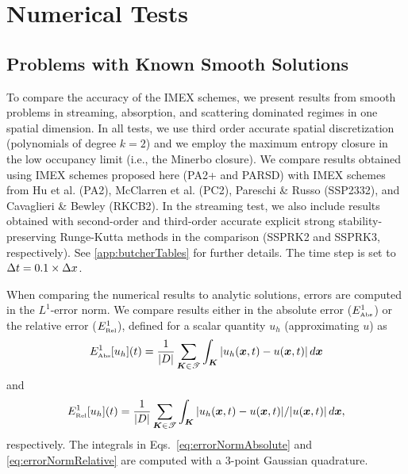\section{Numerical Tests}
\label{sec:numerical}

\subsection{Problems with Known Smooth Solutions}
\label{sec:smoothProblems}

To compare the accuracy of the IMEX schemes, we present results from smooth problems in streaming, absorption, and scattering dominated regimes in one spatial dimension.  
In all tests, we use third order accurate spatial discretization (polynomials of degree $k=2$) and we employ the maximum entropy closure in the low occupancy limit (i.e., the Minerbo closure).  
We compare results obtained using IMEX schemes proposed here (PA2+ and PARSD) with IMEX schemes from Hu et al. \cite{hu_etal_2017} (PA2), McClarren et al. \cite{mcclarren_etal_2008} (PC2), Pareschi \& Russo \cite{pareschiRusso_2005} (SSP2332), and Cavaglieri \& Bewley \cite{cavaglieriBewley2015} (RKCB2).  
In the streaming test, we also include results obtained with second-order and third-order accurate explicit strong stability-preserving Runge-Kutta methods \cite{gottlieb_etal_2001} in the comparison (SSPRK2 and SSPRK3, respectively).  
See \ref{app:butcherTables} for further details.  
The time step is set to $\Delta t=0.1\times\Delta x$.  

When comparing the numerical results to analytic solutions, errors are computed in the $L^{1}$-error norm.  
We compare results either in the absolute error ($E_{\mbox{\tiny Abs}}^{1}$) or the relative error ($E_{\mbox{\tiny Rel}}^{1}$), defined for a scalar quantity $u_{h}$ (approximating $u$) as
\begin{equation}
  E_{\mbox{\tiny Abs}}^{1}[u_{h}](t)
  =\frac{1}{|D|}\sum_{\boldsymbol{K}\in\mathscr{T}}\int_{\boldsymbol{K}}|u_{h}(\boldsymbol{x},t)-u(\boldsymbol{x},t)|\,d\boldsymbol{x}
  \label{eq:errorNormAbsolute}
\end{equation}
and
\begin{equation}
  E_{\mbox{\tiny Rel}}^{1}[u_{h}](t)
  =\frac{1}{|D|}\sum_{\boldsymbol{K}\in\mathscr{T}}\int_{\boldsymbol{K}}|u_{h}(\boldsymbol{x},t)-u(\boldsymbol{x},t)|/|u(\boldsymbol{x},t)|\,d\boldsymbol{x},
  \label{eq:errorNormRelative}
\end{equation}
respectively.  
The integrals in Eqs.~\eqref{eq:errorNormAbsolute} and \eqref{eq:errorNormRelative} are computed with a $3$-point Gaussian quadrature.  

